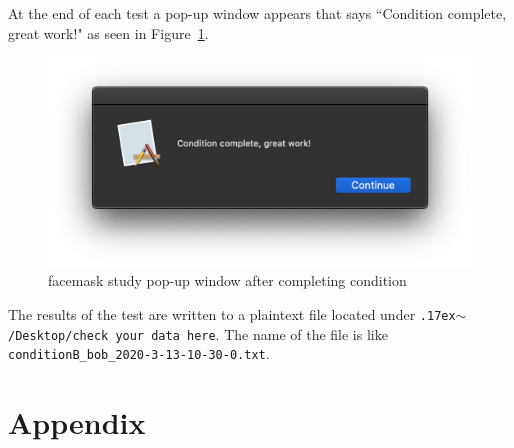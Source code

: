 \documentclass[11pt,pdftex,letterpaper]{article}
\newcommand{\mytilde}{\raise.17ex\hbox{$\scriptstyle\mathtt{\sim}$}}
\begin{document}
At the end of each test a pop-up window appears that says ``Condition complete, great work!" as seen in Figure~\ref{fig:facemask-condition-complete}.
\begin{figure}
	\centering
	\includegraphics[width = 0.9\linewidth]{facemask-condition-complete.png}
	\caption{facemask study pop-up window after completing condition}
	\label{fig:facemask-condition-complete}
\end{figure}

The results of the test are written to a plaintext file located under \texttt{\mytilde/Desktop/check your data here}. The name of the file is like \texttt{conditionB\_bob\_2020-3-13-10-30-0.txt}.

\section{Appendix}

\noindent\begin{minipage}{\textwidth}
	
\end{minipage}

\noindent\begin{minipage}{\textwidth}
	
\end{minipage}

\noindent\begin{minipage}{\textwidth}
	
\end{minipage}

\noindent\begin{minipage}{\textwidth}
	
\end{minipage}
\end{document}
